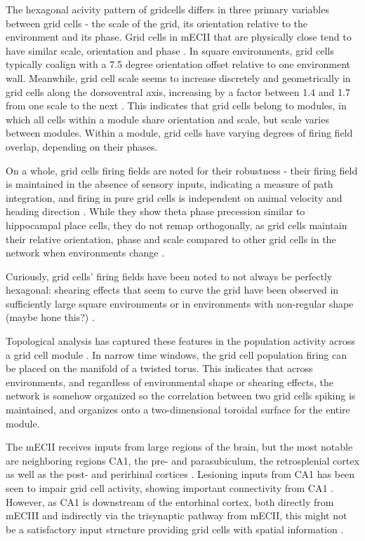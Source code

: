 \documentclass{article}
\begin{document}
    The hexagonal acivity pattern of gridcells differs in three primary variables between grid cells - the scale of the grid, its orientation relative to the environment and its phase. Grid cells in mECII that are physically close tend to have similar scale, orientation and phase \parencite{Hafting2005}. In square environments, grid cells typically coalign with a 7.5 degree orientation offset relative to one environment wall. Meanwhile, grid cell scale seems to increase discretely and geometrically in grid cells along the dorsoventral axis, increasing by a factor between 1.4 and 1.7 from one scale to the next \parencite{Stensola2012}. This indicates that grid cells belong to modules, in which all cells within a module share orientation and scale, but scale varies between modules. Within a module, grid cells have varying degrees of firing field overlap, depending on their phases.

    On a whole, grid cells firing fields are noted for their robustness - their firing field is maintained in the absence of sensory inputs, indicating a measure of path integration, and firing in pure grid cells is independent on animal velocity and heading direction \parencite{Hafting2005}. While they show theta phase precession similar to hippocampal place cells, they do not remap orthogonally, as grid cells maintain their relative orientation, phase and scale compared to other grid cells in the network when environments change \parencite{Hafting2008, Fyhn2007}. 

    Curiously, grid cells' firing fields have been noted to not always be perfectly hexagonal: shearing effects that seem to curve the grid have been observed in sufficiently large square environments or in environments with non-regular shape (maybe hone this?) \parencite{Stensola2015,Krupic2015}.

    Topological analysis has captured these features in the population activity across a grid cell module \parencite{Gardner2022}. In narrow time windows, the grid cell population firing can be placed on the manifold of a twisted torus. This indicates that across environments, and regardless of environmental shape or shearing effects, the network is somehow organized so the correlation between two grid cells spiking is maintained, and organizes onto a two-dimensional toroidal surface for the entire module.

    The mECII receives inputs from large regions of the brain, but the most notable are neighboring regions CA1, the pre- and parasubiculum, the retrosplenial cortex as well as the post- and perirhinal cortices \parencite{Kerr2007}. Lesioning inputs from CA1 has been seen to impair grid cell activity, showing important connectivity from CA1 \parencite{Bonnevie2013}. However, as CA1 is downstream of the entorhinal cortex, both directly from mECIII and indirectly via the trisynaptic pathway from mECII, this might not be a satisfactory input structure providing grid cells with spatial information \parencite{Tamamaki1993,Kerr2007,Witter2017}.
\end{document}
